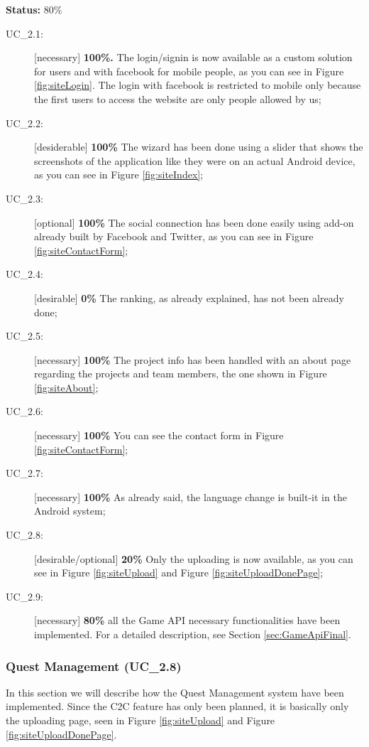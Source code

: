 \textbf{Status:} 80\%
		\begin{description}
			\item[UC\_2.1:] [necessary] \textbf{100\%.} The login/signin is now available as a custom solution for users and with facebook for mobile people, as you can see in Figure \ref{fig:siteLogin}. The login with facebook is restricted to mobile only because the first users to access the website are only people allowed by us;
			\item[UC\_2.2:] [desiderable] \textbf{100\%} The wizard has been done using a slider that shows the screenshots of the application like they were on an actual Android device, as you can see in Figure \ref{fig:siteIndex};
			\item[UC\_2.3:] [optional] \textbf{100\%} The social connection has been done easily using add-on already built by Facebook and Twitter, as you can see in Figure \ref{fig:siteContactForm};
			\item[UC\_2.4:] [desirable] \textbf{0\%} The ranking, as already explained, has not been already done;
			\item[UC\_2.5:] [necessary] \textbf{100\%} The project info has been handled with an about page regarding the projects and team members, the one shown in Figure \ref{fig:siteAbout};
			\item[UC\_2.6:] [necessary] \textbf{100\%} You can see the contact form in Figure \ref{fig:siteContactForm};
			\item[UC\_2.7:] [necessary] \textbf{100\%} As already said, the language change is built-it in the Android system;
			\item[UC\_2.8:] [desirable/optional] \textbf{20\%} Only the uploading is now available, as you can see in Figure \ref{fig:siteUpload} and Figure \ref{fig:siteUploadDonePage};
			\item[UC\_2.9:] [necessary] \textbf{80\%} all the Game API necessary functionalities have been implemented. For a detailed description, see Section \ref{sec:GameApiFinal}.
		\end{description}
	
\subsubsection{Quest Management (UC\_2.8)}

In this section we will describe how the Quest Management system have been implemented. Since the C2C feature has only been planned, it is basically only the uploading page, seen in Figure \ref{fig:siteUpload} and Figure \ref{fig:siteUploadDonePage}.

